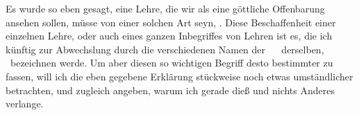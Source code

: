 Es wurde so eben gesagt, eine Lehre, die wir als eine göttliche Offenbarung ansehen sollen, müsse von einer solchen Art seyn, . Diese Beschaffenheit einer einzelnen Lehre, oder auch eines ganzen Inbegriffes von Lehren ist es, die ich künftig zur Abwechslung durch die verschiedenen Namen der ~\  derselben, \usw\ bezeichnen werde. Um aber diesen so wichtigen Begriff desto bestimmter zu fassen, will ich die eben gegebene Erklärung stückweise noch etwas umständlicher betrachten, und zugleich angeben, warum ich gerade dieß und nichts Anderes verlange.
